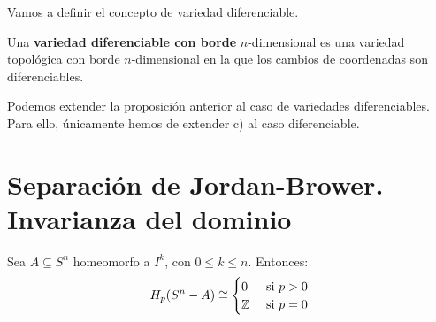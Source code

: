 Vamos a definir el concepto de variedad diferenciable.

\begin{definition}
  Una \textbf{variedad diferenciable con borde} $n$-dimensional es una variedad topológica con borde $n$-dimensional en la que
  los cambios de coordenadas son diferenciables.
\end{definition}

\begin{remark}
  Podemos extender la proposición anterior al caso de variedades diferenciables. Para ello, únicamente hemos de extender
  c) al caso diferenciable.
\end{remark}

\section{Separación de Jordan-Brower. Invarianza del dominio}

\begin{proposition}
  Sea $A \subseteq S^n$ homeomorfo a $I^k$, con $0 \leq k \leq n$. Entonces:
  \[ H_p(S^n - A) \cong \begin{cases} 0 &\text{ si } p > 0 \\ \mathbb{Z} &\text{ si } p = 0 \end{cases} \]
\end{proposition}

